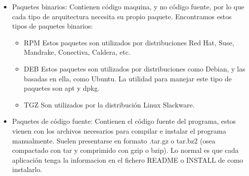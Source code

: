 \documentclass[a4paper, 11pt, oneside]{article}
\begin{document}
\begin{itemize}
    \item Paquetes binarios: Contienen código maquina, y no código fuente, por lo que cada tipo de arquitectura necesita su propio paquete. Encontramos estos tipos de paquetes binarios:
\begin{itemize}
    \item RPM Estos paquetes son utilizados por distribuciones Red Hat, Suse, Mandrake, Conectiva, Caldera, etc. 

    \item DEB Estos paquetes son utilizados por distribuciones como Debian, y las basadas en ella, como Ubuntu. La utilidad para manejar este tipo de paquetes son apt  y dpkg.

    \item TGZ Son utilizados por la distribución Linux Slackware.
 
\end{itemize}

\item Paquetes de código fuente: Contienen el código fuente del programa, estos vienen con los archivos necesarios para compilar e instalar el programa manualmente. Suelen presentarse en formato .tar.gz o tar.bz2 (osea compactado con tar y comprimido con gzip o bzip). Lo normal es que cada aplicación tenga la informacion en el fichero README o INSTALL de  como instalarlo.
 
\end{itemize}
\end{document}

